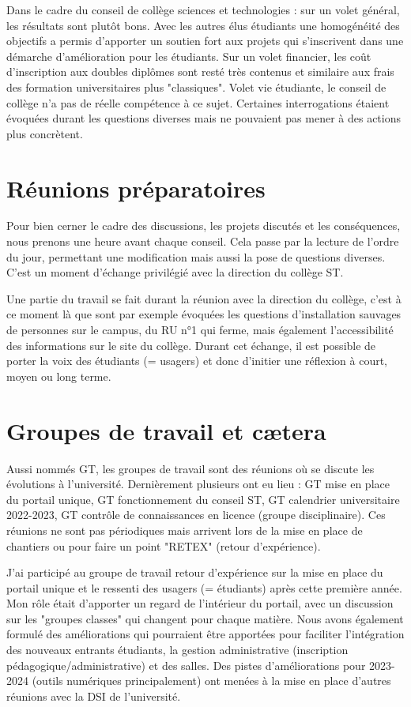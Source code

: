 \documentclass{article}
\begin{document}
Dans le cadre du conseil de collège sciences et technologies : sur un volet général, les résultats sont plutôt bons. Avec les autres élus étudiants une homogénéité des objectifs a permis d'apporter un soutien fort aux projets qui s'inscrivent dans une démarche d'amélioration pour les étudiants. Sur un volet financier, les coût d'inscription aux doubles diplômes sont resté très contenus et similaire aux frais des formation universitaires plus "classiques". Volet vie étudiante, le conseil de collège n'a pas de réelle compétence à ce sujet. Certaines interrogations étaient évoquées durant les questions diverses mais ne pouvaient pas mener à des actions plus concrètent.

\newpage
\section{Réunions préparatoires} 
Pour bien cerner le cadre des discussions, les projets discutés et les conséquences, nous prenons une heure avant chaque conseil. Cela passe par la lecture de l'ordre du jour, permettant une modification mais aussi la pose de questions diverses. C'est un moment d'échange privilégié avec la direction du collège ST. 

Une partie du travail se fait durant la réunion avec la direction du collège, c'est à ce moment là que sont par exemple évoquées les questions d'installation sauvages de personnes sur le campus, du RU n°1 qui ferme, mais également l'accessibilité des informations sur le site du collège. Durant cet échange, il est possible de porter la voix des étudiants (= usagers) et donc d'initier une réflexion à court, moyen ou long terme.

\newpage
\section{Groupes de travail et cætera}
Aussi nommés GT, les groupes de travail sont des réunions où se discute les évolutions à l'université. Dernièrement plusieurs ont eu lieu : GT mise en place du portail unique, GT fonctionnement du conseil ST, GT calendrier  universitaire 2022-2023, GT contrôle de connaissances en licence (groupe disciplinaire). Ces réunions ne sont pas périodiques mais arrivent lors de la mise en place de chantiers ou pour faire un point "RETEX" (retour d'expérience).

J'ai participé au groupe de travail retour d'expérience sur la mise en place du portail unique et le ressenti des usagers (= étudiants) après cette première année. Mon rôle était d'apporter un regard de l'intérieur du portail, avec un discussion sur les "groupes classes" qui changent pour chaque matière. Nous avons également formulé des améliorations qui pourraient être apportées pour faciliter l'intégration des nouveaux entrants étudiants, la gestion administrative (inscription pédagogique/administrative) et des salles. Des pistes d'améliorations pour 2023-2024 (outils numériques principalement) ont menées à la mise en place d'autres réunions avec la DSI de l'université.
\end{document}
